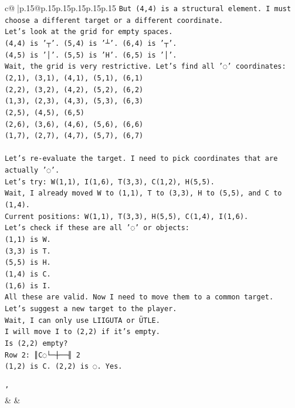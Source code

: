 \documentclass{article}
\begin{document}
{\begin{supertabular}{c@{$\;$}|p{.15\linewidth}@{}p{.15\linewidth}p{.15\linewidth}p{.15\linewidth}p{.15\linewidth}p{.15\linewidth}}
{{{\texttt{But (4,4) is a structural element. I must choose a different target or a different coordinate.} \\
\texttt{Let's look at the grid for empty spaces.} \\
\texttt{(4,4) is '┬'. (5,4) is '┴'. (6,4) is '┬'.} \\
\texttt{(4,5) is '│'. (5,5) is 'H'. (6,5) is '│'.} \\
\texttt{Wait, the grid is very restrictive. Let's find all '◌' coordinates:} \\
\texttt{(2,1), (3,1), (4,1), (5,1), (6,1)} \\
\texttt{(2,2), (3,2), (4,2), (5,2), (6,2)} \\
\texttt{(1,3), (2,3), (4,3), (5,3), (6,3)} \\
\texttt{(2,5), (4,5), (6,5)} \\
\texttt{(2,6), (3,6), (4,6), (5,6), (6,6)} \\
\texttt{(1,7), (2,7), (4,7), (5,7), (6,7)} \\
\\ 
\texttt{Let's re{-}evaluate the target. I need to pick coordinates that are actually '◌'.} \\
\texttt{Let's try: W(1,1), I(1,6), T(3,3), C(1,2), H(5,5).} \\
\texttt{Wait, I already moved W to (1,1), T to (3,3), H to (5,5), and C to (1,4).} \\
\texttt{Current positions: W(1,1), T(3,3), H(5,5), C(1,4), I(1,6).} \\
\texttt{Let's check if these are all '◌' or objects:} \\
\texttt{(1,1) is W.} \\
\texttt{(3,3) is T.} \\
\texttt{(5,5) is H.} \\
\texttt{(1,4) is C.} \\
\texttt{(1,6) is I.} \\
\texttt{All these are valid. Now I need to move them to a common target.} \\
\texttt{Let's suggest a new target to the player.} \\
\texttt{Wait, I can only use LIIGUTA or ÜTLE.} \\
\texttt{I will move I to (2,2) if it's empty.} \\
\texttt{Is (2,2) empty?} \\
\texttt{Row 2: ║C◌└─┼──╢ 2} \\
\texttt{(1,2) is C. (2,2) is ◌. Yes.} \\
\\ 
\texttt{'} \\
            }
        }
    }
    & & \\ \\


\end{supertabular}}
\end{document}
